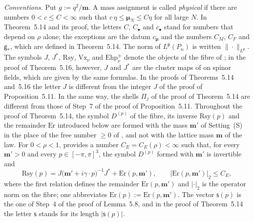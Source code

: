 \documentclass[11pt,letterpaper,reqno]{amsart}
\theoremstyle{definition}
\begin{document}
\emph{Conventions.}
Put $g:=q^2/\mathbf m$.
A mass assignment is called \emph{physical} if there are numbers $0<c\le C<\infty$ such that $c\,\eta\le\boldsymbol\mu_N\le C\eta$ for all large $N$.
In Theorem~5.14 and its proof, the letters $C$, $C_\bullet$ and $c_\bullet$ stand for numbers that depend on $\rho$ alone;
the exceptions are the datum $c_{\boldsymbol\mu}$ and the numbers $C_M$, $C_F$ and $\mathsf g_*$, which are defined in Theorem~5.14.
The norm of $L^{\mathsf p}(P_n)$ is written $\|\cdot\|_{L^{\mathsf p}}$.
The symbols $J$, $J^*$, $\mathrm{Rsy}$, $\mathrm{Vx}_\nu$ and $\mathrm{Ehp}^\pm_\nu$ denote the objects of the fibre of \cite[Section~G5.6.0]{QEDIII};
in the proof of Theorem~5.16, however, $J$ and $J^*$ are the cluster maps of \cite[(I.3.1)]{QEDIII} on spinor fields, which are given by the same formulas.
In the proofs of Theorems~5.14 and~5.16 the letter $J$ is different from the integer $J$ of the proof of Proposition~5.11.
In the same way, the shells $\Pi_j$ of the proof of Theorem~5.14 are different from those of Step~7 of the proof of Proposition~5.11.
Throughout the proof of Theorem~5.14, the symbol $D^{(p)}$ of the fibre, its inverse $\mathrm{Rsy}(p)$ and the remainder $\mathrm{Er}$ introduced below are formed with the mass $\mathbf m'$ of Setting~(S) in the place of the free number $\ge0$ of \cite[Section~G5.6.0]{QEDIII}, and not with the lattice mass $\mathbf m$ of the law.
For $0<\rho<1$, \cite[Proposition~37.1\,(f)]{QEDIII} provides a number $C_E=C_E(\rho)<\infty$ such that, for every $\mathbf m'>0$ and every $p\in[-\pi,\pi]^3$, the symbol $D^{(p)}$ formed with $\mathbf m'$ is invertible and
\begin{equation*}
\mathrm{Rsy}(p)=J\bigl(\mathbf m'+i\gamma\cdot p\bigr)^{-1}J^*+\mathrm{Er}(p,\mathbf m'),\qquad\bigl|\mathrm{Er}(p,\mathbf m')\bigr|_2\le C_E,
\end{equation*}
where the first relation defines the remainder $\mathrm{Er}(p,\mathbf m')$ and $|\cdot|_2$ is the operator norm on the fibre;
one abbreviates $\mathrm{Er}(p):=\mathrm{Er}(p,\mathbf m')$.
The vector $\mathsf s(p)$ is the one of Step~4 of the proof of Lemma~5.8, and in the proof of Theorem~5.14 the letter $\mathsf s$ stands for its length $|\mathsf s(p)|$.
\end{document}
